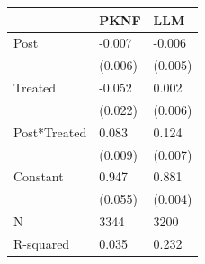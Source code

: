 \begin{tabular}{lll}
\toprule
 & PKNF & LLM \\
\midrule
Post & -0.007 & -0.006 \\
 & (0.006) & (0.005) \\
Treated & -0.052 & 0.002 \\
 & (0.022) & (0.006) \\
Post*Treated & 0.083 & 0.124 \\
 & (0.009) & (0.007) \\
Constant & 0.947 & 0.881 \\
 & (0.055) & (0.004) \\
N & 3344 & 3200 \\
R-squared & 0.035 & 0.232 \\
\bottomrule
\end{tabular}
